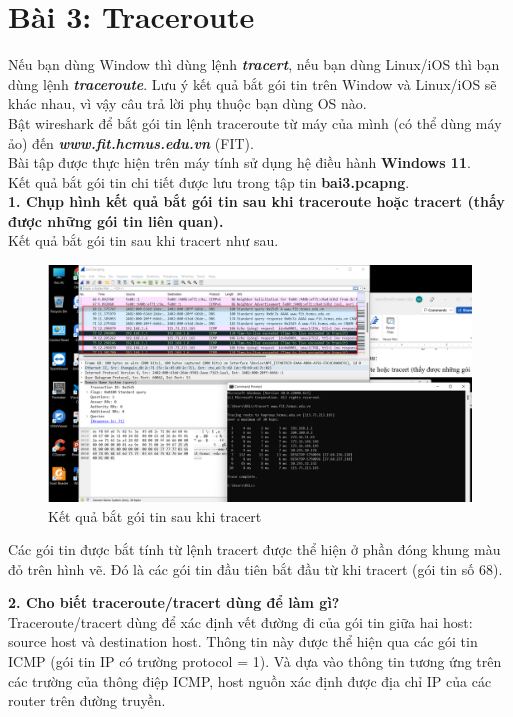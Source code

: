 \section{Bài 3: Traceroute}
Nếu bạn dùng Window thì dùng lệnh \textbf{\textit{tracert}}, nếu bạn dùng Linux/iOS thì bạn dùng lệnh \textbf{\textit{traceroute}}. Lưu ý kết quả bắt gói tin trên Window và Linux/iOS sẽ khác nhau, vì vậy câu trả lời phụ thuộc bạn dùng OS nào.\\
Bật wireshark để bắt gói tin lệnh traceroute từ máy của mình (có thể dùng máy ảo) đến \textbf{\textit{www.fit.hcmus.edu.vn}} (FIT). \\
Bài tập được thực hiện trên máy tính sử dụng hệ điều hành \textbf{Windows 11}.\\
Kết quả bắt gói tin chi tiết được lưu trong tập tin \textbf{bai3.pcapng}.\\

\textbf{1. Chụp hình kết quả bắt gói tin sau khi traceroute hoặc tracert (thấy được những gói tin liên quan).}\\
Kết quả bắt gói tin sau khi tracert như sau.
\begin{figure}[H]
\begin{center}
\includegraphics[scale=.8]{../figures/p3/p3_res1}
\end{center}
\caption{Kết quả bắt gói tin sau khi tracert}
\end{figure}
Các gói tin được bắt tính từ lệnh tracert được thể hiện ở phần đóng khung màu đỏ trên hình vẽ. Đó là các gói tin đầu tiên bắt đầu từ khi tracert (gói tin số 68).

\textbf{2. Cho biết traceroute/tracert dùng để làm gì?}\\
Traceroute/tracert dùng để xác định vết đường đi của gói tin giữa hai host: source host và destination host. 
Thông tin này được thể hiện qua các gói tin ICMP (gói tin IP có trường protocol = 1). Và dựa vào thông tin tương ứng trên các trường của thông điệp ICMP, host nguồn xác định được địa chỉ IP của các router trên đường truyền. \supercite{slides, cn}

